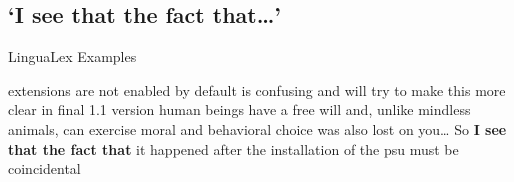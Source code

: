 \documentclass{article}
\begin{document}
\subsection{`I see that the fact that\ldots'}\label{subsecseethat} 

\begin{exe}
\ex LinguaLex Examples 
\begin{xlist}
 extensions are not enabled by default is confusing and will try to make this more clear in final 1.1 version
 human beings have a free will and, unlike mindless animals, can exercise moral and behavioral choice was also lost on you\ldots
\ex So {\bf I see that the fact that} it happened after the installation of the psu must be coincidental
\end{xlist}
\end{exe}

\newpage
%




 
\end{document}
